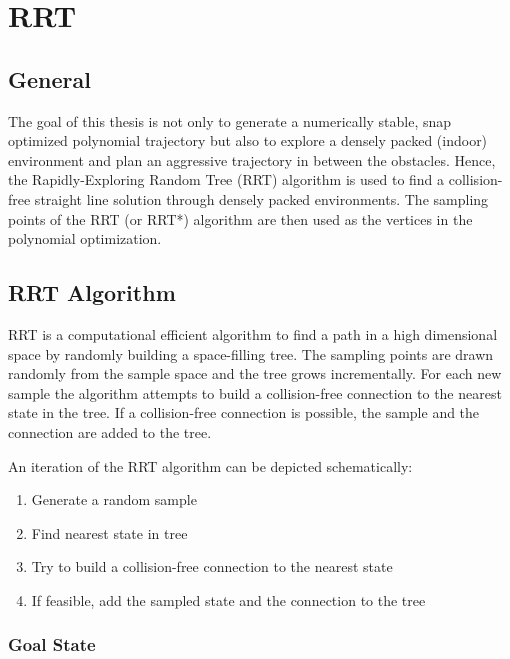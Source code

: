 \chapter{RRT}\label{chap:RRT}

\section{General}

The goal of this thesis is not only to generate a numerically stable, snap optimized polynomial trajectory but also to explore a densely packed (indoor) environment and plan an aggressive trajectory in between the obstacles. Hence, the Rapidly-Exploring Random Tree (RRT) algorithm is used to find a collision-free straight line solution through densely packed environments. The sampling points of the RRT (or RRT*) algorithm are then used as the vertices in the polynomial optimization.


\section{RRT Algorithm}\label{sec:RRT}

RRT is a computational efficient algorithm to find a path in a high dimensional space by randomly building a space-filling tree. The sampling points are drawn randomly from the sample space and the tree grows incrementally. 
For each new sample the algorithm attempts to build a collision-free connection to the nearest state in the tree. If a collision-free connection is possible, the sample and the connection are added to the tree. \newline

An iteration of the RRT algorithm can be depicted schematically:


\begin{enumerate}
  \item Generate a random sample
  \item Find nearest state in tree
  \item Try to build a collision-free connection to the nearest state
  \item If feasible, add the sampled state and the connection to the tree
\end{enumerate}

\subsection{Goal State}

